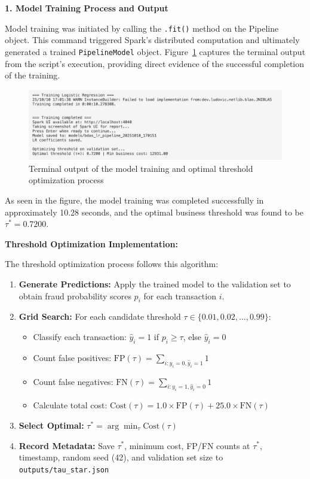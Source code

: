 \documentclass[sigplan,screen]{acmart}
\begin{document}
\textbf{1. Model Training Process and Output}

Model training was initiated by calling the \texttt{.fit()} method on the Pipeline object. This command triggered Spark's distributed computation and ultimately generated a trained\newline
\texttt{PipelineModel} object. Figure~\ref{fig:training-output} captures the terminal output from the script's execution, providing direct evidence of the successful completion of the training.

\begin{figure}[h]
  \centering
  \includegraphics[width=\textwidth]{Figure/7.2a.png}
  \caption{Terminal output of the model training and optimal threshold optimization process}
  \label{fig:training-output}
\end{figure}

As seen in the figure, the model training was completed successfully in approximately 10.28 seconds, and the optimal business threshold was found to be $\tau^* = 0.7200$.

\textbf{Threshold Optimization Implementation:}

The threshold optimization process follows this algorithm:

\begin{enumerate}
\item \textbf{Generate Predictions:} Apply the trained model to the validation set to obtain fraud probability scores $p_i$ for each transaction $i$.
\item \textbf{Grid Search:} For each candidate threshold\newline
$\tau \in \{0.01, 0.02, \ldots, 0.99\}$:
\begin{itemize}
\item Classify each transaction: $\hat{y}_i = 1$ if $p_i \geq \tau$, else $\hat{y}_i = 0$
\item Count false positives: $\text{FP}(\tau) = \sum_{i: y_i=0, \hat{y}_i=1} 1$
\item Count false negatives: $\text{FN}(\tau) = \sum_{i: y_i=1, \hat{y}_i=0} 1$
\item Calculate total cost: $\text{Cost}(\tau) = 1.0 \times \text{FP}(\tau) + 25.0 \times \text{FN}(\tau)$
\end{itemize}
\item \textbf{Select Optimal:} $\tau^* = \arg\min_{\tau} \text{Cost}(\tau)$
\item \textbf{Record Metadata:} Save $\tau^*$, minimum cost, FP/FN counts at $\tau^*$, timestamp, random seed (42), and validation set size to \texttt{outputs/tau\_star.json}
\end{enumerate}
\end{document}
